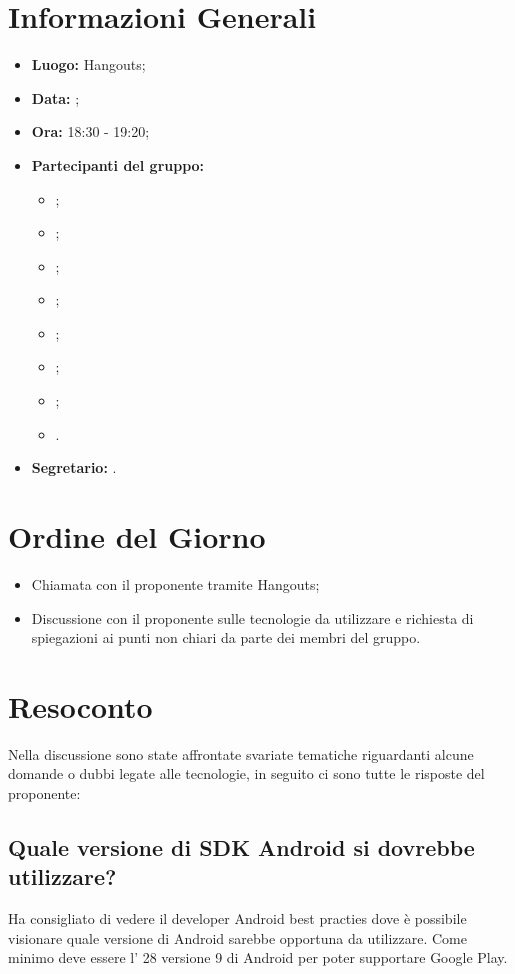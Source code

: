 \section{Informazioni Generali}
\begin{itemize}
\item \textbf{Luogo:} Hangouts;
\item \textbf{Data:} \Data;
\item \textbf{Ora:} 18:30 - 19:20;
\item \textbf{Partecipanti del gruppo:}
	\begin{itemize}
	\item \AT{}; 
	\item \CE{}; 
	\item \DF{};
	\item \LD{};
	\item \PF{};
	\item \SE{};
	\item \BR{};
	\item \MC{}.
	\end{itemize} 
\item \textbf{Segretario:} \MC{}.
\end{itemize}


\section{Ordine del Giorno}
\begin{itemize}
	\item Chiamata con il proponente tramite Hangouts;
	\item Discussione con il proponente sulle tecnologie da utilizzare e richiesta di spiegazioni ai punti non chiari da parte dei membri del gruppo.
\end{itemize}

\section{Resoconto}
Nella discussione sono state affrontate svariate tematiche riguardanti alcune domande o dubbi legate alle tecnologie, in seguito ci sono tutte le risposte del proponente:

\subsection{Quale versione di SDK Android si dovrebbe utilizzare?}
Ha consigliato di vedere il developer Android best practies dove è possibile visionare quale versione  di Android sarebbe opportuna da utilizzare. 
Come minimo deve essere l' 28 versione 9 di Android per poter supportare Google Play.

